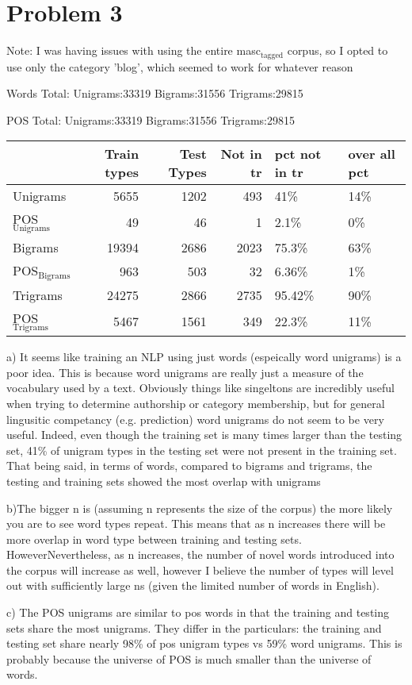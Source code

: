 \documentclass[11pt]{article}
\date{\today}
\title{}
\begin{document}
\tableofcontents

\section{Problem 3}
\label{sec:orgheadline1}
Note: I was having issues with using the entire masc\(_{\text{tagged}}\) corpus,
so I opted to use only the category 'blog', which seemed to work for
whatever reason

Words Total:
Unigrams:33319
Bigrams:31556
Trigrams:29815

POS Total:
Unigrams:33319
Bigrams:31556
Trigrams:29815

\begin{center}
\begin{tabular}{lrrrll}
 & Train types & Test Types & Not in tr & pct not in tr & over all pct\\
\hline
Unigrams & 5655 & 1202 & 493 & 41\% & 14\%\\
POS\(_{\text{Unigrams}}\) & 49 & 46 & 1 & 2.1\% & 0\%\\
Bigrams & 19394 & 2686 & 2023 & 75.3\% & 63\%\\
POS\(_{\text{Bigrams}}\) & 963 & 503 & 32 & 6.36\% & 1\%\\
Trigrams & 24275 & 2866 & 2735 & 95.42\% & 90\%\\
POS\(_{\text{Trigrams}}\) & 5467 & 1561 & 349 & 22.3\% & 11\%\\
\end{tabular}
\end{center}


a) It seems like training an NLP using just words (espeically word unigrams) is a poor idea. This is because word unigrams 
are really just a measure of the vocabulary used by a text. Obviously things like singeltons are incredibly useful when trying
to determine authorship or category membership, but for general lingusitic competancy (e.g. prediction) word unigrams do not seem
to be very useful. Indeed, even though the training set is many times larger than the testing set, 41\% of unigram types in the testing
set were not present in the training set. That being said, in terms of words, compared to bigrams and trigrams, the testing and training sets 
showed the most overlap with unigrams

b)The bigger n is (assuming n represents the size of the corpus) the more likely you are to see word types repeat. This means that as n increases
there will be more overlap in word type between training and testing sets. HoweverNevertheless, as n increases, the number of novel words introduced
into the corpus will increase as well, however I believe the number of types will level out with sufficiently large ns (given the limited number of words in English).

c) The POS unigrams are similar to pos words in that the training and testing sets share the most unigrams. They differ in the particulars: 
the training and testing set share nearly 98\% of pos unigram types vs 59\% word unigrams. This is probably because the universe of POS is much
smaller than the universe of words.
\end{document}
